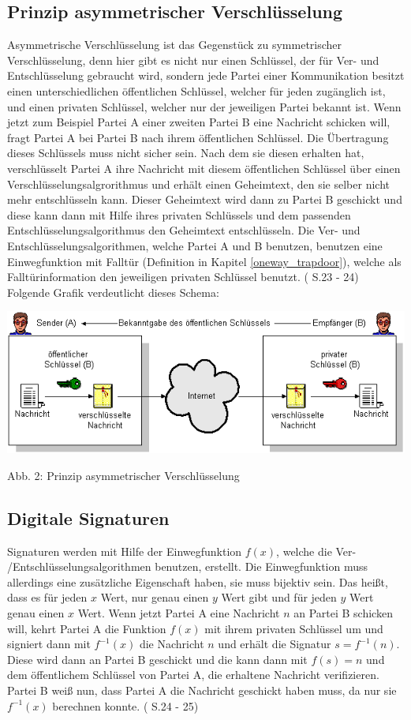 \documentclass[a4paper,12pt,titlepage]{article}
\begin{document}
\subsection{Prinzip asymmetrischer Verschlüsselung}\label{asymm:prinzip}
Asymmetrische Verschlüsselung ist das Gegenstück zu symmetrischer Verschlüsselung, denn hier gibt es nicht nur einen Schlüssel, der für Ver- und Entschlüsselung gebraucht wird, sondern jede Partei einer Kommunikation besitzt einen unterschiedlichen öffentlichen Schlüssel, welcher für jeden zugänglich ist, und einen privaten Schlüssel, welcher nur der jeweiligen Partei bekannt ist. Wenn jetzt zum Beispiel Partei A einer zweiten Partei B eine Nachricht schicken will, fragt Partei A bei Partei B nach ihrem öffentlichen Schlüssel. Die Übertragung dieses Schlüssels muss nicht sicher sein. Nach dem sie diesen erhalten hat, verschlüsselt Partei A ihre Nachricht mit diesem öffentlichen Schlüssel über einen Verschlüsselungsalgrorithmus und erhält einen Geheimtext, den sie selber nicht mehr entschlüsseln kann. Dieser Geheimtext wird dann zu Partei B geschickt und diese kann dann mit Hilfe ihres privaten Schlüssels und dem passenden Entschlüsselungsalgorithmus den Geheimtext entschlüsseln. Die Ver- und Entschlüsselungsalgorithmen, welche Partei A und B benutzen, benutzen eine Einwegfunktion mit Falltür (Definition in Kapitel \ref{oneway_trapdoor}), welche als Falltürinformation den jeweiligen privaten Schlüssel benutzt. (\cite{delfs_knebl} S.23 - 24) \newline Folgende Grafik verdeutlicht dieses Schema:
\begin{center}
\includegraphics[scale=0.7,natwidth=622,natheight=222]{asymm_shema.png} %
\end{center}
Abb. 2: Prinzip asymmetrischer Verschlüsselung
\subsection{Digitale Signaturen}\label{asymm:sign}
Signaturen werden mit Hilfe der Einwegfunktion $f(x)$, welche die Ver- /Entschlüsselungsalgorithmen benutzen, erstellt. Die Einwegfunktion muss allerdings eine zusätzliche Eigenschaft haben, sie muss bijektiv sein. Das heißt, dass es für jeden $x$ Wert, nur genau einen $y$ Wert gibt und für jeden $y$ Wert genau einen $x$ Wert.
Wenn jetzt Partei A eine Nachricht $n$ an Partei B schicken will, kehrt Partei A die Funktion $f(x)$ mit ihrem privaten Schlüssel um und signiert dann mit $f^{-1}(x)$ die Nachricht $n$ und erhält die Signatur $s = f^{-1}(n)$. Diese wird dann an Partei B geschickt und die kann dann mit $f(s) = n$ und dem öffentlichem Schlüssel von Partei A, die erhaltene Nachricht verifizieren. Partei B weiß nun, dass Partei A die Nachricht geschickt haben muss, da nur sie $f^{-1}(x)$ berechnen konnte. (\cite{delfs_knebl} S.24 - 25)
\end{document}
